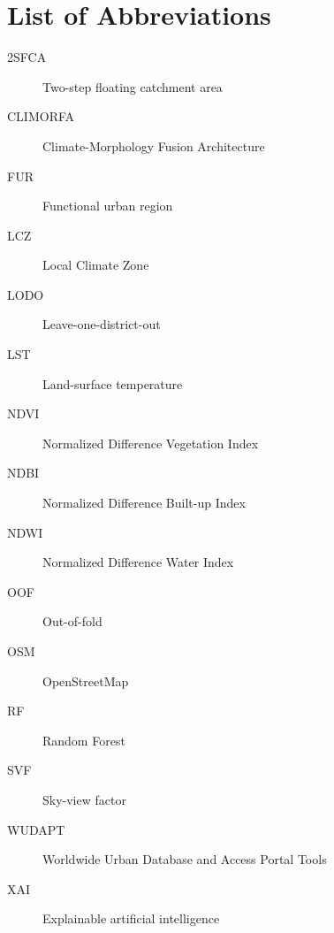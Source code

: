 \documentclass[review,1p]{elsarticle}
\begin{document}
    \graphicspath{{../../figures/main/}{../../figures/supplementary/}}

    

    \doublespacing
    \ifdefined\withlinenumbers
        \linenumbers
    \fi
    \acresetall

    
    
    
    
    
    
    
    

    \clearpage
    \section*{List of Abbreviations}
    \begin{description}
        \item[2SFCA] Two-step floating catchment area
        \item[CLIMORFA] Climate-Morphology Fusion Architecture
        \item[FUR] Functional urban region
        \item[LCZ] Local Climate Zone
        \item[LODO] Leave-one-district-out
        \item[LST] Land-surface temperature
        \item[NDVI] Normalized Difference Vegetation Index
        \item[NDBI] Normalized Difference Built-up Index
        \item[NDWI] Normalized Difference Water Index
        \item[OOF] Out-of-fold
        \item[OSM] OpenStreetMap
        \item[RF] Random Forest
        \item[SVF] Sky-view factor
        \item[WUDAPT] Worldwide Urban Database and Access Portal Tools
        \item[XAI] Explainable artificial intelligence
    \end{description}

    \clearpage
    

    \clearpage
    
\end{document}
